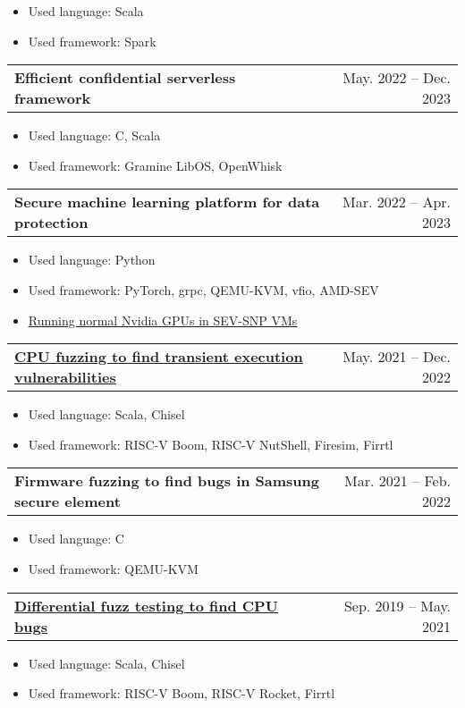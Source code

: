 \documentclass[letterpaper,11pt]{article}
\makeatletter
\newcommand{\resumeItem}[1]{
  \item\small{
    {#1 \vspace{-2pt}}
  }
}
\newcommand{\resumeProjectHeading}[2]{
    \item
    \begin{tabular*}{0.97\textwidth}[t]{l@{\extracolsep{\fill}}r}
      \textbf{#1} & #2
    \end{tabular*}\vspace{-7pt}
}
\newcommand{\resumeItemListStart}{\begin{itemize}}
\newcommand{\resumeItemListEnd}{\end{itemize}\vspace{-5pt}}
\makeatother
\begin{document}
        \resumeItemListStart
            \resumeItem
                {Used language: Scala}
            \resumeItem
                {Used framework: Spark}
        \resumeItemListEnd

      \resumeProjectHeading
          {\textbf{Efficient confidential serverless framework}}
          {May. 2022 -- Dec. 2023}

        \resumeItemListStart
            \resumeItem
                {Used language: C, Scala}
            \resumeItem
                {Used framework: Gramine LibOS, OpenWhisk}
        \resumeItemListEnd

      \resumeProjectHeading
          {\textbf{Secure machine learning platform for data protection}}
          {Mar. 2022 -- Apr. 2023}

        \resumeItemListStart
            \resumeItem
                {Used language: Python}
            \resumeItem
                {Used framework: PyTorch, grpc, QEMU-KVM, vfio, AMD-SEV}
            \resumeItem
                {\href{https://github.com/JaewonHur/sev-snp-gpu}{\underline{Running normal Nvidia GPUs in SEV-SNP VMs}}}
        \resumeItemListEnd

      \resumeProjectHeading
          {\href{https://github.com/compsec-snu/specdoctor}{\textbf{\underline{CPU fuzzing to find transient execution vulnerabilities}}}}
          {May. 2021 -- Dec. 2022}

        \resumeItemListStart
            \resumeItem
                {Used language: Scala, Chisel}
            \resumeItem
                {Used framework: RISC-V Boom, RISC-V NutShell, Firesim, Firrtl}
        \resumeItemListEnd

      \resumeProjectHeading
          {\textbf{Firmware fuzzing to find bugs in Samsung secure element}}
          {Mar. 2021 -- Feb. 2022}

        \resumeItemListStart
            \resumeItem
                {Used language: C}
            \resumeItem
                {Used framework: QEMU-KVM}
        \resumeItemListEnd


      \resumeProjectHeading
          {\href{https://github.com/compsec-snu/difuzz-rtl}{\textbf{\underline{Differential fuzz testing to find CPU bugs}}}}
          {Sep. 2019 -- May. 2021}

        \resumeItemListStart
            \resumeItem
                {Used language: Scala, Chisel}
            \resumeItem
                {Used framework: RISC-V Boom, RISC-V Rocket, Firrtl}
        \resumeItemListEnd
\end{document}
